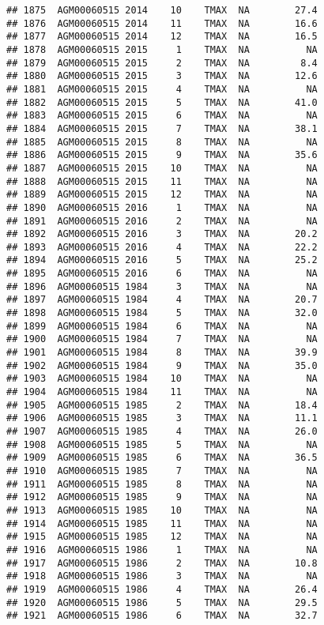 \documentclass{article}\usepackage[]{graphicx}\usepackage[]{color}
\makeatletter
\newenvironment{kframe}{%
 \def\at@end@of@kframe{}%
 \ifinner\ifhmode%
  \def\at@end@of@kframe{\end{minipage}}%
  \begin{minipage}{\columnwidth}%
 \fi\fi%
 \def\FrameCommand##1{\hskip\@totalleftmargin \hskip-\fboxsep
 \colorbox{shadecolor}{##1}\hskip-\fboxsep
     \hskip-\linewidth \hskip-\@totalleftmargin \hskip\columnwidth}%
 \MakeFramed {\advance\hsize-\width
   \@totalleftmargin\z@ \linewidth\hsize
   \@setminipage}}%
 {\par\unskip\endMakeFramed%
 \at@end@of@kframe}
\newenvironment{knitrout}{}{} %
\makeatother
\begin{document}
\begin{knitrout}
\begin{kframe}
\begin{verbatim}
## 1875  AGM00060515 2014    10    TMAX  NA        27.4
## 1876  AGM00060515 2014    11    TMAX  NA        16.6
## 1877  AGM00060515 2014    12    TMAX  NA        16.5
## 1878  AGM00060515 2015     1    TMAX  NA          NA
## 1879  AGM00060515 2015     2    TMAX  NA         8.4
## 1880  AGM00060515 2015     3    TMAX  NA        12.6
## 1881  AGM00060515 2015     4    TMAX  NA          NA
## 1882  AGM00060515 2015     5    TMAX  NA        41.0
## 1883  AGM00060515 2015     6    TMAX  NA          NA
## 1884  AGM00060515 2015     7    TMAX  NA        38.1
## 1885  AGM00060515 2015     8    TMAX  NA          NA
## 1886  AGM00060515 2015     9    TMAX  NA        35.6
## 1887  AGM00060515 2015    10    TMAX  NA          NA
## 1888  AGM00060515 2015    11    TMAX  NA          NA
## 1889  AGM00060515 2015    12    TMAX  NA          NA
## 1890  AGM00060515 2016     1    TMAX  NA          NA
## 1891  AGM00060515 2016     2    TMAX  NA          NA
## 1892  AGM00060515 2016     3    TMAX  NA        20.2
## 1893  AGM00060515 2016     4    TMAX  NA        22.2
## 1894  AGM00060515 2016     5    TMAX  NA        25.2
## 1895  AGM00060515 2016     6    TMAX  NA          NA
## 1896  AGM00060515 1984     3    TMAX  NA          NA
## 1897  AGM00060515 1984     4    TMAX  NA        20.7
## 1898  AGM00060515 1984     5    TMAX  NA        32.0
## 1899  AGM00060515 1984     6    TMAX  NA          NA
## 1900  AGM00060515 1984     7    TMAX  NA          NA
## 1901  AGM00060515 1984     8    TMAX  NA        39.9
## 1902  AGM00060515 1984     9    TMAX  NA        35.0
## 1903  AGM00060515 1984    10    TMAX  NA          NA
## 1904  AGM00060515 1984    11    TMAX  NA          NA
## 1905  AGM00060515 1985     2    TMAX  NA        18.4
## 1906  AGM00060515 1985     3    TMAX  NA        11.1
## 1907  AGM00060515 1985     4    TMAX  NA        26.0
## 1908  AGM00060515 1985     5    TMAX  NA          NA
## 1909  AGM00060515 1985     6    TMAX  NA        36.5
## 1910  AGM00060515 1985     7    TMAX  NA          NA
## 1911  AGM00060515 1985     8    TMAX  NA          NA
## 1912  AGM00060515 1985     9    TMAX  NA          NA
## 1913  AGM00060515 1985    10    TMAX  NA          NA
## 1914  AGM00060515 1985    11    TMAX  NA          NA
## 1915  AGM00060515 1985    12    TMAX  NA          NA
## 1916  AGM00060515 1986     1    TMAX  NA          NA
## 1917  AGM00060515 1986     2    TMAX  NA        10.8
## 1918  AGM00060515 1986     3    TMAX  NA          NA
## 1919  AGM00060515 1986     4    TMAX  NA        26.4
## 1920  AGM00060515 1986     5    TMAX  NA        29.5
## 1921  AGM00060515 1986     6    TMAX  NA        32.7

\end{verbatim}
\end{kframe}
\end{knitrout}
\end{document}
